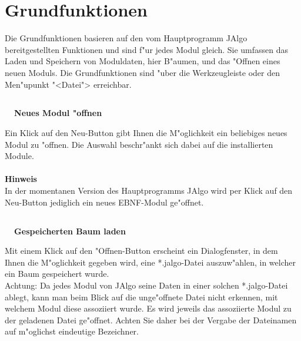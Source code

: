 
\section{Grundfunktionen}

Die Grundfunktionen basieren auf den vom Hauptprogramm JAlgo bereitgestellten Funktionen und sind f"ur jedes Modul gleich.
Sie umfassen das Laden und Speichern von Moduldaten, hier B"aumen, und das "Offnen eines neuen Moduls. Die Grundfunktionen sind "uber die Werkzeugleiste oder den Men"upunkt 
{\sc "<Datei">} erreichbar.


\medskip
\subsection[Neues Modul "offnen]{ }
\vspace{-4.3ex} {\bf {\large \qquad \quad \ \ Neues Modul "offnen}} 


Ein Klick auf den {\sc Neu}-Button gibt Ihnen die M"oglichkeit ein beliebiges neues Modul zu "offnen. Die Auswahl  
beschr"ankt sich dabei auf die installierten Module. \\
\\
{\bf Hinweis} \\
In der momentanen Version des Hauptprogramms JAlgo wird per Klick auf den {\sc Neu}-Button jediglich ein neues {\sc EBNF}-Modul
ge"offnet. \\


\medskip
\subsection[Gespeicherten Baum laden]{}
\vspace{-4.3ex} {\bf {\large \qquad \quad \ \ Gespeicherten Baum laden}} 


Mit einem Klick auf den {\sc "Offnen}-Button erscheint ein Dialogfenster, in dem Ihnen die M"oglichkeit 
gegeben wird, eine *.jalgo-Datei auszuw"ahlen, in welcher ein Baum gespeichert wurde.  \\
Achtung: Da jedes Modul von JAlgo seine Daten in einer solchen *.jalgo-Datei ablegt, kann man beim Blick auf die unge"offnete Datei nicht erkennen, mit welchem Modul diese assoziiert wurde. Es wird jeweils das assoziierte Modul zu der geladenen Datei ge"offnet. Achten Sie daher bei der Vergabe der Dateinamen auf m"oglichst eindeutige Bezeichner.


